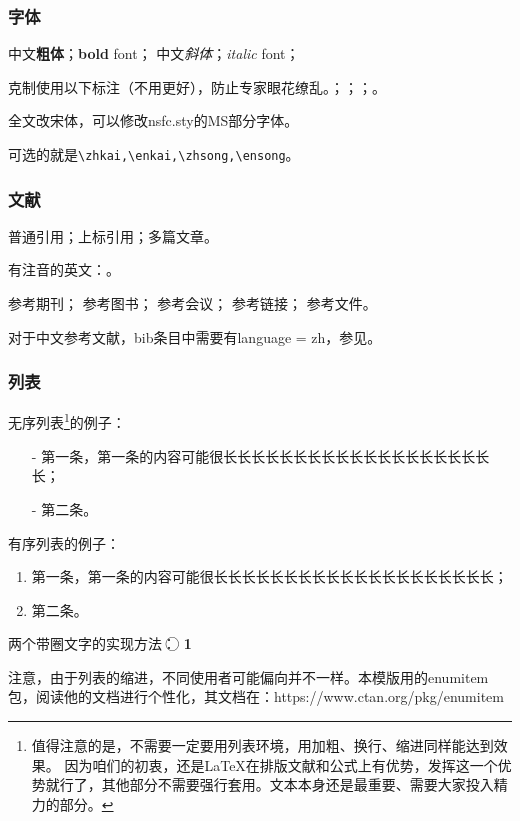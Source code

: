 \subsubsection{字体}
中文\textbf{粗体}；\textbf{bold} font；
中文\textit{斜体}；\textit{italic} font；

克制使用以下标注（不用更好），防止专家眼花缭乱。；；；。

全文改宋体，可以修改nsfc.sty的MS部分字体。

可选的就是\verb|\zhkai,\enkai,\zhsong,\ensong|。

\subsubsection{文献}
普通引用\cite{test}；上标引用；多篇文章。

有注音的英文：\cite{test}。

参考期刊\cite{test}；
参考图书\cite{test2}；
参考会议\cite{test5}；
参考链接\cite{test4}；
参考文件\cite{test6}。

对于中文参考文献，bib条目中需要有language = {zh}，参见\cite{test2}。
\subsubsection{列表}
无序列表\footnote{值得注意的是，不需要一定要用列表环境，用加粗、换行、缩进同样能达到效果。
	因为咱们的初衷，还是LaTeX在排版文献和公式上有优势，发挥这一个优势就行了，其他部分不需要强行套用。文本本身还是最重要、需要大家投入精力的部分。}的例子：
\begin{itemize}[left= 50pt]
	\item[-] 第一条，第一条的内容可能很长长长长长长长长长长长长长长长长长长长长；
	\item[-] 第二条。
\end{itemize}

有序列表的例子：
\begin{enumerate}[left= 50pt]
	\item 第一条，第一条的内容可能很长长长长长长长长长长长长长长长长长长长长；
	\item 第二条。
\end{enumerate}

两个带圈文字的实现方法：
\textcircled{\raisebox{-0.8pt}{1}}
\textcircled{\textbf{\small 1}}

注意，由于列表的缩进，不同使用者可能偏向并不一样。本模版用的enumitem包，阅读他的文档进行个性化，其文档在：https://www.ctan.org/pkg/enumitem


